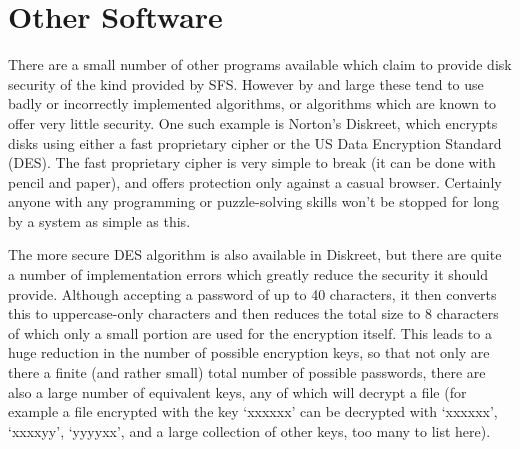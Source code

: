 




\section{Other Software}

There are a small number of other programs available which claim to provide
disk security of the kind provided by SFS.  However by and large these tend to
use badly or incorrectly implemented algorithms, or algorithms which are known
to offer very little security.  One such example is Norton's Diskreet, which
encrypts disks using either a fast proprietary cipher or the US Data Encryption
Standard (DES).  The fast proprietary cipher is very simple to break (it can be
done with pencil and paper), and offers protection only against a casual 
browser.  Certainly anyone with any programming or puzzle-solving skills won't 
be stopped for long by a system as simple as this.

The more secure DES algorithm is also available in Diskreet, but there are
quite a number of implementation errors which greatly reduce the security it
should provide.  Although accepting a password of up to 40 characters, it then
converts this to uppercase-only characters and then reduces the total size to 8
characters of which only a small portion are used for the encryption itself.
This leads to a huge reduction in the number of possible encryption keys, so
that not only are there a finite (and rather small) total number of possible
passwords, there are also a large number of equivalent keys, any of which will
decrypt a file (for example a file encrypted with the key `xxxxxx' can be
decrypted with `xxxxxx', `xxxxyy', `yyyyxx', and a large collection of other
keys, too many to list here).


